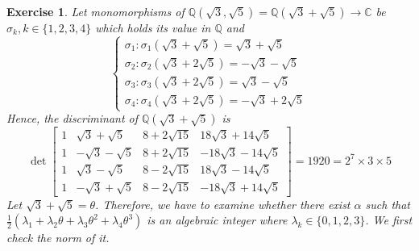 \documentclass{article}
\theoremstyle{breakstyle}
\newtheorem{exercise}{Exercise}[section]
\begin{document}
\begin{exercise}
    Let monomorphisms of $\mathbb{Q}(\sqrt{3}, \sqrt{5}) = \mathbb{Q}(\sqrt{3} + \sqrt{5}) \longrightarrow \mathbb{C}$ be $\sigma_k, k \in \{1, 2, 3, 4\}$ which holds its value in $\mathbb{Q}$ and
    \[ 
        \begin{cases}
            \sigma_1 : \sigma_1(\sqrt{3} + \sqrt{5}) = \sqrt{3} + \sqrt{5} \\
            \sigma_2 : \sigma_2(\sqrt{3} + 2\sqrt{5}) = -\sqrt{3} - \sqrt{5} \\
            \sigma_3 : \sigma_3(\sqrt{3} + 2\sqrt{5}) = \sqrt{3} - \sqrt{5} \\
            \sigma_4 : \sigma_4(\sqrt{3} + 2\sqrt{5}) = -\sqrt{3} + 2\sqrt{5}
        \end{cases} 
    \]
    Hence, the discriminant of $\mathbb{Q}(\sqrt{3} + \sqrt{5})$ is
    \[ 
        \det \begin{bmatrix}
            1 & \sqrt{3} + \sqrt{5}  & 8 + 2\sqrt{15} & 18\sqrt{3} + 14\sqrt{5} \\
            1 & -\sqrt{3} - \sqrt{5} & 8 + 2\sqrt{15} & -18\sqrt{3} - 14\sqrt{5} \\
            1 & \sqrt{3} - \sqrt{5}  & 8 - 2\sqrt{15} & 18\sqrt{3} - 14\sqrt{5} \\
            1 & -\sqrt{3} + \sqrt{5} & 8 - 2\sqrt{15} & -18\sqrt{3} + 14\sqrt{5}
        \end{bmatrix} = 1920 = 2^7 \times 3 \times 5 
    \]
    Let $\sqrt{3} + \sqrt{5} = \theta$. Therefore, we have to examine whether there exist $\alpha$ such that $\frac{1}{2}(\lambda_1 + \lambda_2 \theta + \lambda_3 \theta^2 + \lambda_4 \theta^3)$ is an algebraic integer where $\lambda_k \in \{0, 1, 2, 3\}$. We first check the norm of it.
\end{exercise}
\end{document}
